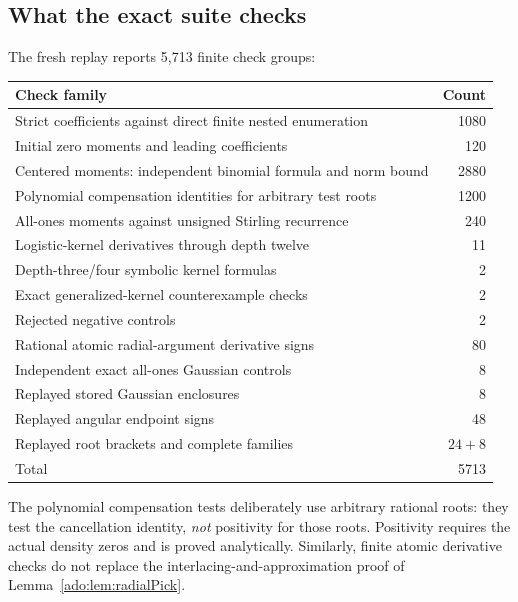 \subsection{What the exact suite checks}
The fresh replay reports 5,713 finite check groups:
\begin{center}\small
\begin{tabularx}{\linewidth}{@{}Xr@{}}
\toprule
Check family & Count\\
\midrule
Strict coefficients against direct finite nested enumeration & 1080\\
Initial zero moments and leading coefficients & 120\\
Centered moments: independent binomial formula and norm bound & 2880\\
Polynomial compensation identities for arbitrary test roots & 1200\\
All-ones moments against unsigned Stirling recurrence & 240\\
Logistic-kernel derivatives through depth twelve & 11\\
Depth-three/four symbolic kernel formulas & 2\\
Exact generalized-kernel counterexample checks & 2\\
Rejected negative controls & 2\\
Rational atomic radial-argument derivative signs & 80\\
Independent exact all-ones Gaussian controls & 8\\
Replayed stored Gaussian enclosures & 8\\
Replayed angular endpoint signs & 48\\
Replayed root brackets and complete families & $24+8$\\
\midrule
Total & 5713\\
\bottomrule
\end{tabularx}
\end{center}
The polynomial compensation tests deliberately use arbitrary rational
roots: they test the cancellation identity, \emph{not} positivity for
those roots. Positivity requires the actual density zeros and is proved
analytically. Similarly, finite atomic derivative checks do not replace
the interlacing-and-approximation proof of
Lemma~\ref{ado:lem:radialPick}.

